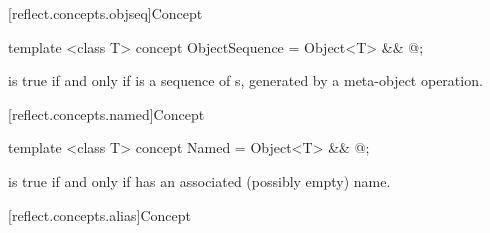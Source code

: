 [reflect.concepts.objseq]{Concept }
\begin{std.txt}\color{addclr}

\begin{itemdecl}
template <class T> concept ObjectSequence = Object<T> && @\seebelow@;
\end{itemdecl}

\begin{itemdescr}
\pnum
{} is true if and only if  is a sequence of s, generated by a meta-object operation.

\end{itemdescr}
\end{std.txt}

[reflect.concepts.named]{Concept }

\begin{std.txt}\color{addclr}

\begin{itemdecl}
template <class T> concept Named = Object<T> && @\seebelow@;
\end{itemdecl}

\begin{itemdescr}
\pnum
{} is true if and only if  has an associated (possibly empty) name.

\end{itemdescr}
\end{std.txt}

[reflect.concepts.alias]{Concept }


